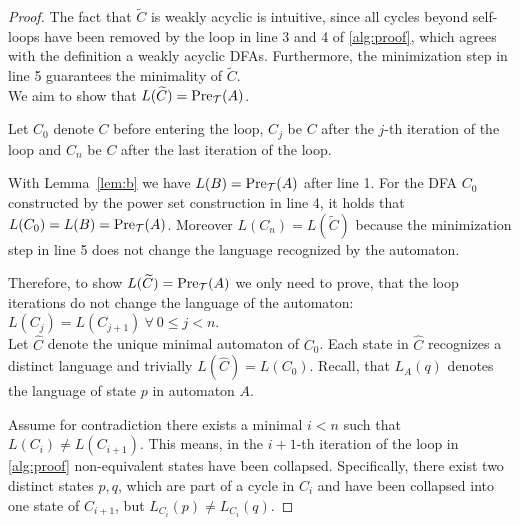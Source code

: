 \begin{proof}
The fact that $\widetilde{C}$ is weakly acyclic is intuitive, since all cycles beyond self-loops have been removed by the loop in line 3 and 4 of \autoref{alg:proof}, which agrees with the definition a weakly acyclic DFAs. Furthermore, the minimization step in line 5 guarantees the minimality of $\widetilde{C}$.
\\ 

We aim to show that $L(\widetilde{C}) = \operatorname{\text{Pre}}_{\mathcal{T}}(A)$.

Let $C_{0}$ denote $C$ before entering the loop, $C_{j}$ be $C$ after the $j$-th iteration of the loop and $C_{n}$ be $C$ after the last iteration of the loop.

With Lemma~\ref{lem:b} we have $L(B) = \operatorname{\text{Pre}}_{\mathcal{T}}(A)$ after line 1. For the DFA $C_{0}$ constructed by the power set construction in line 4, it holds that $L(C_{0}) = L(B) = \operatorname{\text{Pre}}_{\mathcal{T}}(A)$. Moreover $L(C_{n}) = L(\widetilde{C})$ because the minimization step in line 5 does not change the language recognized by the automaton.

Therefore, to show $L(\widetilde{C}) = \operatorname{\text{Pre}}_{\mathcal{T}}(A)$ we only need to prove, that the loop iterations do not change the language of the automaton: $L(C_{j}) = L(C_{j+1}) \ \forall \ 0 \le j < n$. \\


Let $\widehat{C}$ denote the unique minimal automaton of $C_{0}$. Each state in $\widehat{C}$ recognizes a distinct language and trivially $L(\widehat{C}) = L(C_{0})$. Recall, that $L_{A}(q)$ denotes the language of state $p$ in automaton $A$. 

Assume for contradiction there exists a minimal $i<n$ such that  $L(C_{i}) \neq L(C_{i+1})$. This means, in the $i+1$-th iteration of the loop in \autoref{alg:proof} non-equivalent states have been collapsed.
Specifically, there exist two distinct states $p,q$, which are part of a cycle in $C_{i}$ and have been collapsed into one state of $C_{i+1}$, but $L_{C_{i}}(p) \neq L_{C_{i}}(q)$.


\end{proof}
